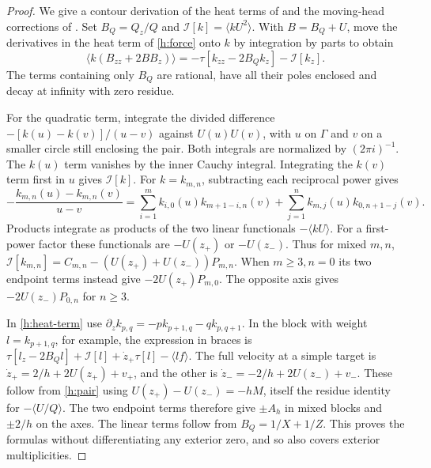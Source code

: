 \begin{proof}
We give a contour derivation of the heat terms of
\cite[Eqs.~(3.5)--(3.7)]{agc} and the moving-head corrections of
\cite{jh02}. Set \(B_Q=Q_z/Q\) and
\(\mathcal I[k]=\langle kU^2\rangle\).
With \(B=B_Q+U\), move the derivatives in the heat term of
\eqref{h:force} onto \(k\) by integration by parts to obtain
\begin{equation}\label{h:heat-term}
 \langle k(B_{zz}+2BB_z)\rangle
     =-\tau[k_{zz}-2B_Qk_z]-\mathcal I[k_z].
\end{equation}
The terms containing only \(B_Q\) are rational, have all their
poles enclosed and decay at infinity with zero residue.

For the quadratic term, integrate the divided difference
\(-[k(u)-k(v)]/(u-v)\) against \(U(u)U(v)\), with \(u\) on
\(\Gamma\) and \(v\) on a smaller circle still enclosing the pair.
Both integrals are normalized by \((2\pi i)^{-1}\).
The \(k(u)\) term vanishes by the inner Cauchy integral. Integrating
the \(k(v)\) term first in \(u\) gives \(\mathcal I[k]\).
For \(k=k_{m,n}\), subtracting each reciprocal power gives
\begin{equation}\label{h:split-dd}
 -\frac{k_{m,n}(u)-k_{m,n}(v)}{u-v}
   =\sum_{i=1}^{m} k_{i,0}(u)k_{m+1-i,n}(v)
    +\sum_{j=1}^{n} k_{m,j}(u)k_{0,n+1-j}(v).
\end{equation}
Products integrate as products of the two linear functionals
\(-\langle kU\rangle\). For a first-power factor these functionals
are \(-U(z_+)\) or \(-U(z_-)\). Thus for mixed \(m,n\),
\(\mathcal I[k_{m,n}]=C_{m,n}-(U(z_+)+U(z_-))P_{m,n}\).
When \(m\ge3,n=0\) its two endpoint terms instead give
\(-2U(z_+)P_{m,0}\). The opposite axis gives
\(-2U(z_-)P_{0,n}\) for \(n\ge3\).

In \eqref{h:heat-term} use
\(\partial_z k_{p,q}=-p k_{p+1,q}-q k_{p,q+1}\).
In the block with weight \(l=k_{p+1,q}\), for example, the
expression in braces is
\(\tau[l_z-2B_Ql]+\mathcal I[l]+\dot z_+\tau[l]
 -\langle lf\rangle\).
The full velocity at a simple target is
\(\dot z_+=2/h+2U(z_+)+v_+\), and the other is
\(\dot z_-=-2/h+2U(z_-)+v_-\).
These follow from \eqref{h:pair} using
\(U(z_+)-U(z_-)=-hM\), itself the residue identity for
\(-\langle U/Q\rangle\). The two endpoint terms therefore give
\(\pm A_h\) in mixed blocks and \(\pm2/h\) on the axes.
The linear terms follow from \(B_Q=1/X+1/Z\).
This proves the formulas without differentiating any exterior
zero, and so also covers exterior multiplicities.
\end{proof}

